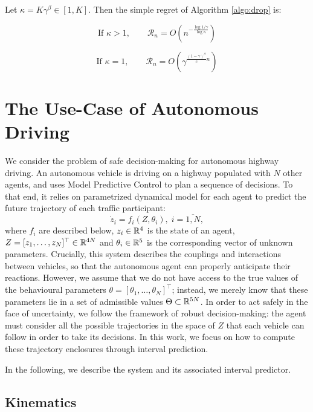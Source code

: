 \documentclass{article}
\begin{document}
\begin{theorem}
\label{theorem:drop-regret}
Let $\kappa = K\gamma^\beta \in [1, K]$. Then the simple regret of Algorithm \ref{algo:drop} is:


\begin{equation}
\text{If } \kappa>1,\qquad 
\mathcal{R}_n = O\left(n^{-\frac{\log 1/\gamma}{\log \kappa}}\right)
\end{equation}

\begin{equation}
\text{If }\kappa=1,\qquad
\mathcal{R}_n = O\left(\gamma^{\frac{(1-\gamma)^\beta}{c}n}\right)
\end{equation}
\end{theorem}

\section{The Use-Case of Autonomous Driving}


We consider the problem of safe decision-making for autonomous highway driving. An autonomous vehicle is driving on a highway populated with $N$ other agents, and uses Model Predictive Control to plan a sequence of decisions. To that end, it relies on parametrized dynamical model for each agent to predict the future trajectory of each traffic participant: \[\dot{z}_i=f_i(Z,\theta_i),\;i=\overline{1,N},\] where $f_i$ are described below, $z_i\in\mathbb{R}^4$ is the state of an agent, $Z = [z_1,\dots,z_N]^\top\in\mathbb{R}^{4N}$ and $\theta_i\in\mathbb{R}^5$ is the corresponding vector of unknown parameters. Crucially, this system describes the couplings and interactions between vehicles, so that the autonomous agent can properly anticipate their reactions. 
However, we assume that we do not have access to the true values of the behavioural parameters $\theta=[\theta_1,\dots,\theta_N]^\top$; instead, we merely know that these parameters lie in a set of admissible values $\Theta\subset\mathbb{R}^{5N}$. In order to act safely in the face of uncertainty, we follow the framework of robust decision-making: the agent must consider all the possible trajectories in the space of $Z$ that each vehicle can follow in order to take its decisions. In this work, we focus on how to compute these trajectory enclosures through interval prediction.

In the following, we describe the system and its associated interval predictor.

\subsection{Kinematics}
\end{document}
